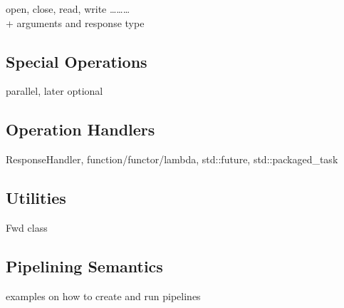 \documentclass{article}
\begin{document}
	open, close, read, write \ldots\ldots\ldots \\
	+
	arguments and response type
	
	\subsection{Special Operations}
	
	parallel, later optional
	
	\subsection{Operation Handlers}
	
	ResponseHandler, function/functor/lambda, std::future, std::packaged_task
	
	\subsection{Utilities}
	
	Fwd class
	
	\subsection{Pipelining Semantics}
	
	examples on how to create and run pipelines
	
\end{document}
